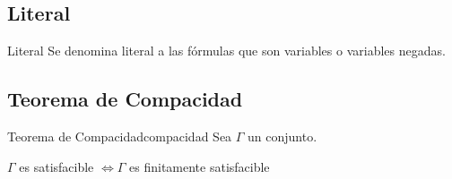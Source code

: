 \subsection{Literal}

\begin{definicion}{Literal}{}
    Se denomina literal a las fórmulas que son variables o variables negadas.
\end{definicion}


\subsection{Teorema de Compacidad}

%

\begin{teorema}{Teorema de Compacidad}{compacidad}
    Sea $\Gamma$ un conjunto.

    \medskip

    \begin{center}
        $\Gamma$ es satisfacible $\iff \Gamma$ es finitamente satisfacible
    \end{center}
\end{teorema}

